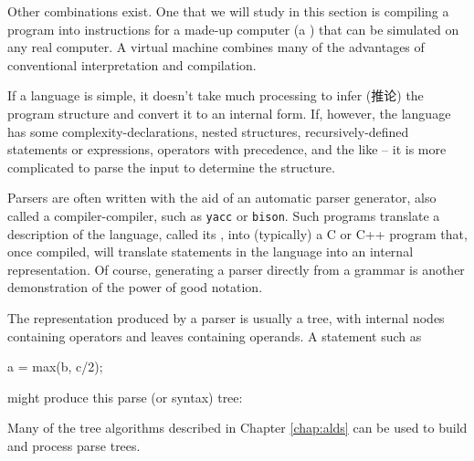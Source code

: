 Other combinations exist. One that we will study in this section is
compiling a program into instructions for a made-up computer (a
) that can be simulated on any real
computer. A virtual machine combines many of the advantages of conventional
interpretation and compilation.

If a language is simple, it doesn't take much processing to infer (推论)
the program structure and convert it to an internal form. If, however, the
language has some complexity-declarations, nested structures,
recursively-defined statements or expressions, operators with precedence,
and the like -- it is more complicated to parse the input to determine the
structure.

Parsers are often written with the aid of an automatic parser generator,
also called a compiler-compiler, such as \verb'yacc' or \verb'bison'. Such
programs translate a description of the language, called its
, into (typically) a C or C++ program that, once
compiled, will translate statements in the language into an internal
representation. Of course, generating a parser directly from a grammar is
another demonstration of the power of good notation.

The representation produced by a parser is usually a tree, with internal
nodes containing operators and leaves containing operands. A statement such
as
\begin{wellcode}
    a = max(b, c/2);
\end{wellcode}
might produce this parse (or syntax) tree:
\begin{center}
\end{center}
Many of the tree algorithms described in Chapter \ref{chap:alds} can be
used to build and process parse trees.

